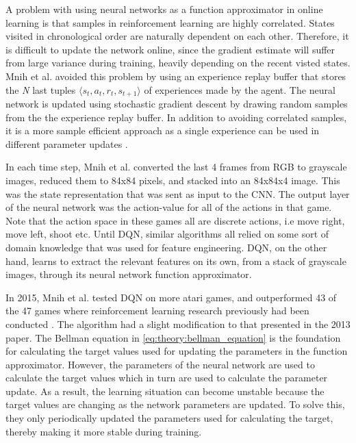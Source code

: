 \documentclass[class=book, crop=false, 11pt]{standalone}
\begin{document}
A problem with using neural networks as a function approximator in online learning is that samples in reinforcement learning are highly correlated. States visited in chronological order are naturally dependent on each other. Therefore, it is difficult to update the network online, since the gradient estimate will suffer from large variance during training, heavily depending on the recent visted states. Mnih et al. avoided this problem by using an experience replay buffer that stores the \textit{N} last tuples $\langle s_{t}, a_{t}, r_{t}, s_{t+1}\rangle$ of experiences made by the agent. The neural network is updated using stochastic gradient descent by drawing random samples from the the experience replay buffer. In addition to avoiding correlated samples, it is a more sample efficient approach as a single experience can be used in different parameter updates \cite{DQN_Mnih_et_al_2013}.


In each time step, Mnih et al. converted the last 4 frames from RGB to grayscale images, reduced them to 84x84 pixels, and stacked into an 84x84x4 image. This was the state representation that was sent as input to the CNN. The output layer of the neural network was the action-value for all of the actions in that game. Note that the action space in these games all are discrete actions, i.e move right, move left, shoot etc. Until DQN, similar algorithms all relied on some sort of domain knowledge that was used for feature engineering. DQN, on the other hand, learns to extract the relevant features on its own, from a stack of grayscale images, through its neural network function approximator.

In 2015, Mnih et al. tested DQN on more atari games, and outperformed 43 of the 47 games where reinforcement learning research previously had been conducted \cite{mnih2015_humanlevel}. The algorithm had a slight modification to that presented in the 2013 paper. The Bellman equation in \eqref{eq:theory:bellman_equation} is the foundation for calculating the target values used for updating the parameters in the function approximator. However, the parameters of the neural network are used to calculate the target values which in turn are used to calculate the parameter update. As a result, the learning situation can become unstable because the target values are changing as the network parameters are updated. To solve this, they only periodically updated the parameters used for calculating the target, thereby making it more stable during training. 
\end{document}
